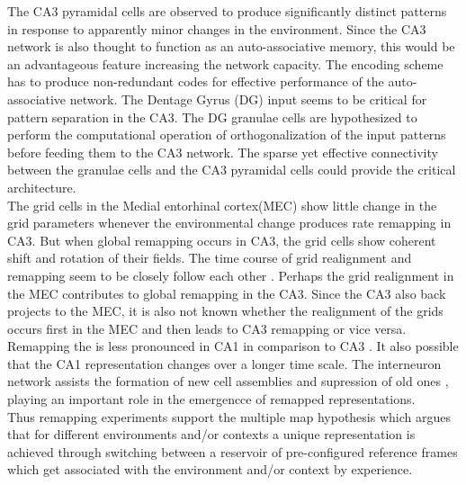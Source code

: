 The CA3 pyramidal cells are observed to produce significantly distinct patterns in response to apparently minor changes in the environment. Since the CA3 network is also thought to function as an auto-associative memory, this would be an advantageous feature increasing the network capacity. The encoding scheme has to produce non-redundant codes for effective performance of the auto-associative network. The Dentage Gyrus (DG) input seems to be critical for pattern separation in the CA3. The DG granulae cells are hypothesized to perform the computational operation of orthogonalization of the input patterns before feeding them to the CA3 network. The sparse yet effective connectivity between the granulae cells and the CA3 pyramidal cells could provide the critical architecture.\\ The grid cells in the Medial entorhinal cortex(MEC) show little change in the grid parameters whenever the environmental change produces rate remapping in CA3. But when global remapping occurs in CA3, the grid cells show coherent shift and rotation of their fields. The time course of grid realignment and remapping seem to be closely follow each other \cite{Fyhn2007}. Perhaps the grid realignment in the MEC contributes to global remapping in the CA3. Since the CA3 also back projects to the MEC, it is also not known whether the realignment of the grids occurs first in the MEC and then leads to CA3 remapping or vice versa. Remapping the is less pronounced in CA1 in comparison to CA3 \cite{Leutgeb2005a, Leutgeb2004}. It also possible that the CA1 representation changes over a longer time scale. The interneuron network assists the formation of new cell assemblies and supression of old ones \cite{Dupret2013}, playing an important role in the emergencce of remapped representations.\\ 

Thus remapping experiments support the multiple map hypothesis which argues that for different environments and/or contexts a unique representation is achieved through switching between a reservoir of pre-configured reference frames which get associated with the environment and/or context by experience.
